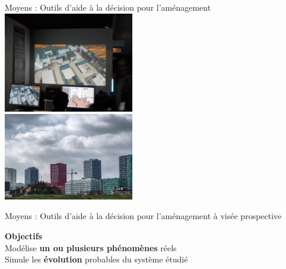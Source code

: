 \documentclass[xcolor=table]{beamer}
\begin{document}
\begin{frame}{Moyens : Outils d'aide à la décision pour l'aménagement}
\centering
		\includegraphics[width=5.7cm]{Images/bureau.jpg}	
\\
		\includegraphics[width=5.7cm]{Images/simcity.jpg}	
\end{frame}

\begin{frame}{Moyens : Outils d'aide à la décision pour l'aménagement à visée prospective}
\begin{block}{}
	\textbf{Objectifs}\\
	Modélise \textbf{un ou plusieurs phénomènes} réels\\
	Simule les \textbf{évolution} probables du système étudié\\
\end{block}
\end{frame}
\end{document}
